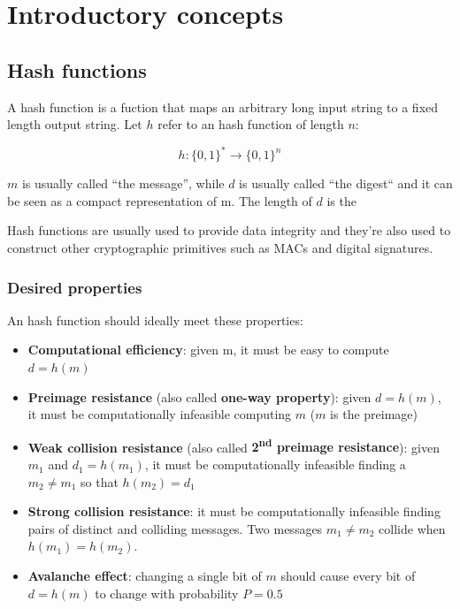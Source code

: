\section{Introductory concepts}

\subsection{Hash functions}
A hash function is a fuction that maps an arbitrary long input string to a fixed
length output string. Let $h$ refer to an hash function of length $n$:

\[
  h\colon \{0,1\}^* \to \{0,1\}^n
\]

$m$ is usually called ``the message'', while $d$ is usually called ``the digest``
and it can be seen as a compact representation of m. The length of $d$ is the

Hash functions are usually used to provide data integrity and they're also used to
construct other cryptographic primitives such as MACs and digital signatures.

\subsubsection{Desired properties}
An hash function should ideally meet these properties:
\begin{itemize}
  \item \textbf{Computational efficiency}: given m, it must be easy to compute ${d=h(m)}$
  \item \textbf{Preimage resistance} (also called \textbf{one-way property}):
  given ${d=h(m)}$, it must be computationally infeasible computing $m$ ($m$ is the
  preimage)
  \item \textbf{Weak collision resistance} (also called
  \textbf{2\textsuperscript{nd} preimage resistance}): given $m_1$ and ${d_1=h(m_1)}$,
  it must be computationally infeasible finding a $m_2 \neq m_1$ so that ${h(m_2)=d_1}$
  \item \textbf{Strong collision resistance}: it must be computationally infeasible
  finding pairs of distinct and colliding messages. Two messages $m_1\neq m_2$
  collide when ${h(m_1)=h(m_2)}$.
  \item \textbf{Avalanche effect}: changing a single bit of $m$ should cause every
  bit of ${d=h(m)}$ to change with probability ${P=0.5}$
\end{itemize}

